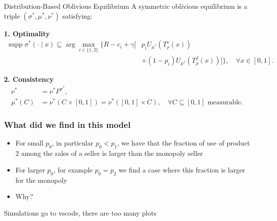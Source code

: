 \documentclass[10pt]{beamer}
\begin{document}
\begin{frame}{Distribution-Based Oblivious Equilibrium}
    A symmetric oblivious equilibrium is a triple
    $(\sigma^*,\mu^*,\nu^*)$ satisfying:

    \medskip
    \textbf{1. Optimality}
        \begin{equation*}
            \begin{aligned}
            \operatorname{supp}\sigma^*(\cdot\mid x)
            \subseteq
            \arg\max_{i\in\{1,2\}}
            \Big\{
            R-c_i+\gamma\big[
            &p_iU_{\mu^*}(T_\rho^s(x))\\
            &+(1-p_i)U_{\mu^*}(T_\rho^f(x))
            \big]
            \Big\},
            \quad \forall x\in[0,1].
            \end{aligned}
        \end{equation*}

    \medskip
    \textbf{2. Consistency}
        \begin{equation*}
            \begin{aligned}
            \nu^*&=\nu^*P^{\sigma^*},\\
            \mu^*(C)&=\nu^*(C\times[0,1])
            =\nu^*([0,1]\times C),
            \quad \forall C\subseteq[0,1]\text{ measurable}.
            \end{aligned}
        \end{equation*}
\end{frame}

\begin{frame}
    \frametitle{What did we find in this model}
    \begin{itemize}
        \item For small $p_0$, in particular $p_0<p_1$, we have that the fraction of use of product 2 among the sales of a seller is larger than the monopoly seller
        \item For larger $p_0$, for example $p_0=p_2$ we find a case where this fraction is larger for the monopoly 
        \item Why? 
    \end{itemize}
\end{frame}


\begin{frame}{Simulations}
    go to vscode, there are too many plots 
\end{frame}
\end{document}

